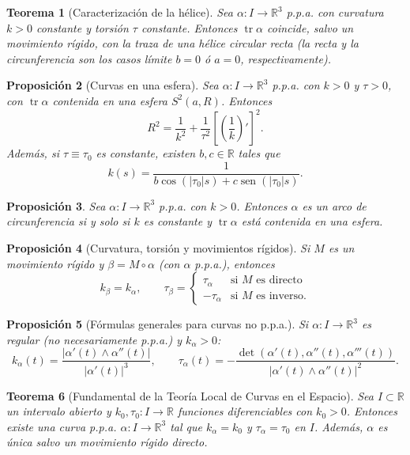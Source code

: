 \documentclass[11pt]{article}
\DeclareMathOperator{\tr}{tr}
\DeclareMathOperator{\sen}{sen}
\theoremstyle{plain}
\newtheorem{teorema}{Teorema}[section]
\newtheorem{proposicion}[teorema]{Proposición}
\theoremstyle{definition}
\theoremstyle{remark}
\begin{document}
\begin{teorema}[Caracterización de la hélice]
Sea $\alpha:I\to\mathbb{R}^3$ p.p.a. con curvatura $k>0$ constante y torsión $\tau$ constante. Entonces $\tr\alpha$ coincide, salvo un movimiento rígido, con la traza de una hélice circular recta (la recta y la circunferencia son los casos límite $b=0$ ó $a=0$, respectivamente).
\end{teorema}

\begin{proposicion}[Curvas en una esfera]
Sea $\alpha:I\to\mathbb{R}^3$ p.p.a. con $k>0$ y $\tau>0$, con $\tr\alpha$ contenida en una esfera $S^2(a,R)$. Entonces
\[
R^2=\frac{1}{k^2}+\frac{1}{\tau^2}\left[\left(\frac1k\right)'\right]^2.
\]
Además, si $\tau\equiv\tau_0$ es constante, existen $b,c\in\mathbb{R}$ tales que
\[
k(s)=\frac{1}{b\cos(|\tau_0|s)+c\sen(|\tau_0|s)}.
\]
\end{proposicion}

\begin{proposicion}
Sea $\alpha:I\to\mathbb{R}^3$ p.p.a. con $k>0$. Entonces $\alpha$ es un arco de circunferencia si y solo si $k$ es constante y $\tr\alpha$ está contenida en una esfera.
\end{proposicion}

\begin{proposicion}[Curvatura, torsión y movimientos rígidos]
Si $M$ es un movimiento rígido y $\beta=M\circ\alpha$ (con $\alpha$ p.p.a.), entonces
\[
k_\beta=k_\alpha, \qquad \tau_\beta=\begin{cases}\tau_\alpha & \text{si $M$ es directo}\\ -\tau_\alpha & \text{si $M$ es inverso.}\end{cases}
\]
\end{proposicion}

\begin{proposicion}[Fórmulas generales para curvas no p.p.a.]
Si $\alpha:I\to\mathbb{R}^3$ es regular (no necesariamente p.p.a.) y $k_\alpha>0$:
\[
\boxed{k_\alpha(t)=\frac{|\alpha'(t)\land\alpha''(t)|}{|\alpha'(t)|^3}}, \qquad
\boxed{\tau_\alpha(t)=-\frac{\det(\alpha'(t),\alpha''(t),\alpha'''(t))}{|\alpha'(t)\land\alpha''(t)|^2}}.
\]
\end{proposicion}

\begin{teorema}[Fundamental de la Teoría Local de Curvas en el Espacio]
Sea $I\subset\mathbb{R}$ un intervalo abierto y $k_0,\tau_0:I\to\mathbb{R}$ funciones diferenciables con $k_0>0$. Entonces existe una curva p.p.a. $\alpha:I\to\mathbb{R}^3$ tal que $k_\alpha=k_0$ y $\tau_\alpha=\tau_0$ en $I$. Además, $\alpha$ es única salvo un movimiento rígido directo.
\end{teorema}
\end{document}
